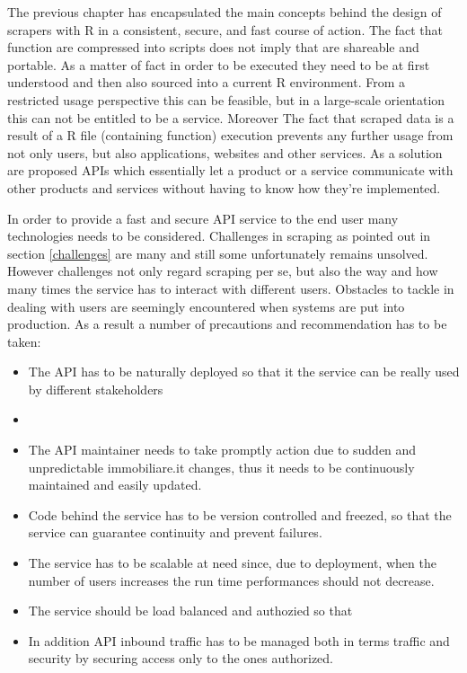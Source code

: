 \documentclass[
  12pt,
  a4paper,
  oneside]{book}
\theoremstyle{definition}
\theoremstyle{definition}
\theoremstyle{definition}
\theoremstyle{remark}
\begin{document}
The previous chapter has encapsulated the main concepts behind the design of scrapers with R in a consistent, secure, and fast course of action. The fact that function are compressed into scripts does not imply that are shareable and portable. As a matter of fact in order to be executed they need to be at first understood and then also sourced into a current R environment. From a restricted usage perspective this can be feasible, but in a large-scale orientation this can not be entitled to be a service. Moreover The fact that scraped data is a result of a R file (containing function) execution prevents any further usage from not only users, but also applications, websites and other services.
As a solution are proposed APIs which essentially let a product or a service communicate with other products and services without having to know how they're implemented.

In order to provide a fast and secure API service to the end user many technologies needs to be considered. Challenges in scraping as pointed out in section \ref{challenges} are many and still some unfortunately remains unsolved. However challenges not only regard scraping per se, but also the way and how many times the service has to interact with different users. Obstacles to tackle in dealing with users are seemingly encountered when systems are put into production. As a result a number of precautions and recommendation has to be taken:

\begin{itemize}
\item
  The API has to be naturally deployed so that it the service can be really used by different stakeholders
\item
\item
  The API maintainer needs to take promptly action due to sudden and unpredictable immobiliare.it changes, thus it needs to be continuously maintained and easily updated.
\item
  Code behind the service has to be version controlled and freezed, so that the service can guarantee continuity and prevent failures.
\item
  The service has to be scalable at need since, due to deployment, when the number of users increases the run time performances should not decrease.
\item
  The service should be load balanced and authozied so that
\item
  In addition API inbound traffic has to be managed both in terms traffic and security by securing access only to the ones authorized.
\end{itemize}
\end{document}
